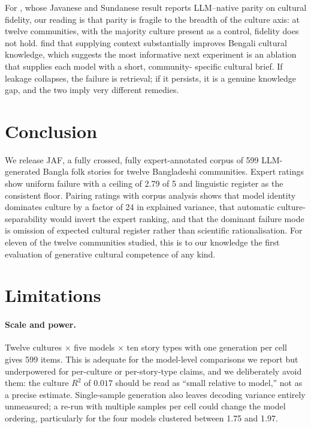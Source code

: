 \documentclass[11pt]{article}
\begin{document}
For \citet{pranida-etal-2025-culturally}, whose Javanese and Sundanese result
reports LLM--native parity on cultural fidelity, our reading is that parity is
fragile to the breadth of the culture axis: at twelve communities, with the
majority culture present as a control, fidelity does not hold.
\citet{chowdhury-etal-2025-facts} find that supplying context substantially
improves Bengali cultural knowledge, which suggests the most informative next
experiment is an ablation that supplies each model with a short, community-
specific cultural brief. If leakage collapses, the failure is retrieval; if it
persists, it is a genuine knowledge gap, and the two imply very different
remedies.

\section{Conclusion}

We release JAF, a fully crossed, fully expert-annotated corpus of 599
LLM-generated Bangla folk stories for twelve Bangladeshi communities. Expert
ratings show uniform failure with a ceiling of 2.79 of 5 and linguistic
register as the consistent floor. Pairing ratings with corpus analysis shows
that model identity dominates culture by a factor of 24 in explained variance,
that automatic culture-separability would invert the expert ranking, and that
the dominant failure mode is omission of expected cultural register rather
than scientific rationalisation. For eleven of the twelve communities studied, this
is to our knowledge the first evaluation of generative cultural competence of
any kind.

\section*{Limitations}

\paragraph{Scale and power.} Twelve cultures $\times$ five models $\times$ ten
story types with one generation per cell gives 599 items. This is adequate for
the model-level comparisons we report but underpowered for per-culture or
per-story-type claims, and we deliberately avoid them: the culture $R^2$ of
$0.017$ should be read as ``small relative to model,'' not as a precise
estimate. Single-sample generation also leaves decoding variance entirely
unmeasured; a re-run with multiple samples per cell could change the model
ordering, particularly for the four models clustered between 1.75 and 1.97.
\end{document}
